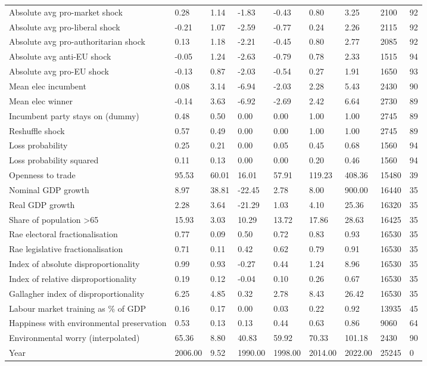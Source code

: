 \begin{longtable}{lllllllll}
Absolute avg pro-market shock & 0.28 & 1.14 & -1.83 & -0.43 & 0.80 & 3.25 & 2100 & 92\\
Absolute avg pro-liberal shock & -0.21 & 1.07 & -2.59 & -0.77 & 0.24 & 2.26 & 2115 & 92\\
Absolute avg pro-authoritarian shock & 0.13 & 1.18 & -2.21 & -0.45 & 0.80 & 2.77 & 2085 & 92\\
Absolute avg anti-EU shock & -0.05 & 1.24 & -2.63 & -0.79 & 0.78 & 2.33 & 1515 & 94\\
\addlinespace
Absolute avg pro-EU shock & -0.13 & 0.87 & -2.03 & -0.54 & 0.27 & 1.91 & 1650 & 93\\
Mean elec incumbent & 0.08 & 3.14 & -6.94 & -2.03 & 2.28 & 5.43 & 2430 & 90\\
Mean elec winner & -0.14 & 3.63 & -6.92 & -2.69 & 2.42 & 6.64 & 2730 & 89\\
Incumbent party stays on (dummy) & 0.48 & 0.50 & 0.00 & 0.00 & 1.00 & 1.00 & 2745 & 89\\
Reshuffle shock & 0.57 & 0.49 & 0.00 & 0.00 & 1.00 & 1.00 & 2745 & 89\\
\addlinespace
Loss probability & 0.25 & 0.21 & 0.00 & 0.05 & 0.45 & 0.68 & 1560 & 94\\
Loss probability squared & 0.11 & 0.13 & 0.00 & 0.00 & 0.20 & 0.46 & 1560 & 94\\
Openness to trade & 95.53 & 60.01 & 16.01 & 57.91 & 119.23 & 408.36 & 15480 & 39\\
Nominal GDP growth & 8.97 & 38.81 & -22.45 & 2.78 & 8.00 & 900.00 & 16440 & 35\\
Real GDP growth & 2.28 & 3.64 & -21.29 & 1.03 & 4.10 & 25.36 & 16320 & 35\\
\addlinespace
Share of population >65 & 15.93 & 3.03 & 10.29 & 13.72 & 17.86 & 28.63 & 16425 & 35\\
Rae electoral fractionalisation & 0.77 & 0.09 & 0.50 & 0.72 & 0.83 & 0.93 & 16530 & 35\\
Rae legislative fractionalisation & 0.71 & 0.11 & 0.42 & 0.62 & 0.79 & 0.91 & 16530 & 35\\
Index of absolute disproportionality & 0.99 & 0.93 & -0.27 & 0.44 & 1.24 & 8.96 & 16530 & 35\\
Index of relative disproportionality & 0.19 & 0.12 & -0.04 & 0.10 & 0.26 & 0.67 & 16530 & 35\\
\addlinespace
Gallagher index of disproportionality & 6.25 & 4.85 & 0.32 & 2.78 & 8.43 & 26.42 & 16530 & 35\\
Labour market training as \% of GDP & 0.16 & 0.17 & 0.00 & 0.03 & 0.22 & 0.92 & 13935 & 45\\
Happiness with environmental preservation & 0.53 & 0.13 & 0.13 & 0.44 & 0.63 & 0.86 & 9060 & 64\\
Environmental worry (interpolated) & 65.36 & 8.80 & 40.83 & 59.92 & 70.33 & 101.18 & 2430 & 90\\
Year & 2006.00 & 9.52 & 1990.00 & 1998.00 & 2014.00 & 2022.00 & 25245 & 0\\
\bottomrule
\end{longtable}
